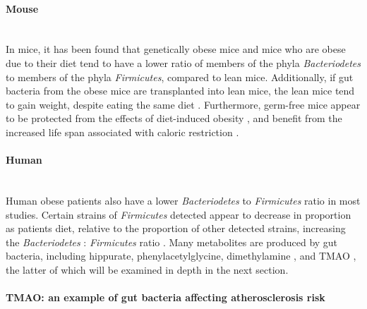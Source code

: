 \paragraph{Mouse}\mbox{}\\
In mice, it has been found that genetically obese mice \cite{turnbaugh2006obesity} and mice who are obese due to their diet \cite{turnbaugh2008diet} tend to have a lower ratio of members of the phyla \textit{Bacteriodetes} to members of the phyla \textit{Firmicutes}, compared to lean mice. Additionally, if gut bacteria from the obese mice are transplanted into lean mice, the lean mice tend to gain weight, despite eating the same diet \cite{turnbaugh2006obesity}. Furthermore, germ-free mice appear to be protected from the effects of diet-induced obesity \cite{backhed2007mechanisms}, and benefit from the increased life span associated with caloric restriction \cite{gordon1966aging}.

\paragraph{Human}\mbox{}\\
Human obese patients also have a lower \textit{Bacteriodetes} to \textit{Firmicutes} ratio \cite{turnbaugh2006obesity} in most studies. Certain strains of \textit{Firmicutes} detected appear to decrease in proportion as patients diet, relative to the proportion of other detected strains, increasing the \textit{Bacteriodetes} : \textit{Firmicutes} ratio \cite{duncan2008human}. Many metabolites are produced by gut bacteria, including hippurate, phenylacetylglycine, dimethylamine \cite{yap2008metabonomic}, and TMAO \cite{tang2013intestinal}, the latter of which will be examined in depth in the next section.

\paragraph{TMAO: an example of gut bacteria affecting atherosclerosis risk}\mbox{}\\

